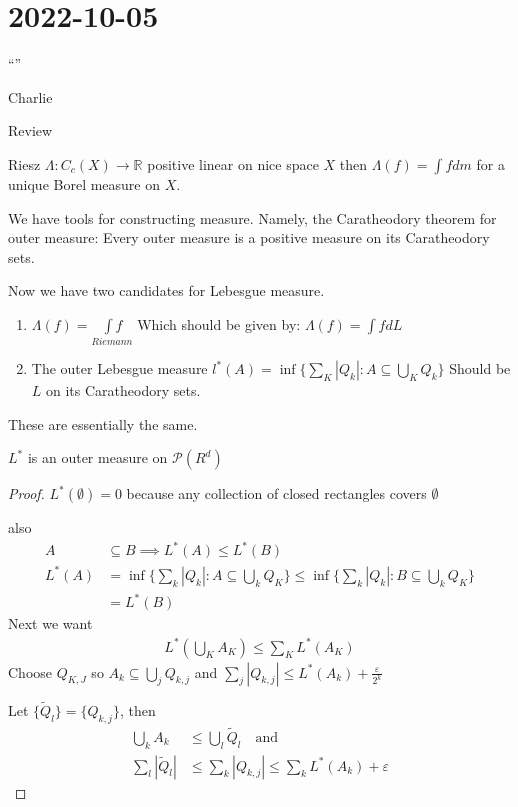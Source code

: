 \section{ 2022-10-05 }

\epigraph{``''}{Charlie}

Review

\begin{theorem}
	Riesz $ \Lambda : C_c (X) \to \mathbb{R}$ positive linear on nice space $X$ then $\Lambda(f) = \int f dm$ for a unique Borel measure on $X$.
\end{theorem}

We have tools for constructing measure. Namely, the Caratheodory theorem for outer measure: Every outer measure is a positive measure on its Caratheodory sets.

Now we have two candidates for Lebesgue measure.

\begin{enumerate}
	\item $\Lambda (f) = \underset{Riemann}{\int f}$
		Which should be given by: $\Lambda(f) = \int f dL$
	\item The outer Lebesgue measure  $l^* (A) = \inf\{\sum_K |Q_k| : A \subseteq \bigcup_{K} Q_k \}$ Should be $L$ on its Caratheodory sets.
\end{enumerate}

These are essentially the same.

\begin{lemma}
	$L^*$ is an outer measure on $\mathcal{P}(R^d)$
\end{lemma}

\begin{proof}
	$L^* (\emptyset)= 0$ because any collection of closed rectangles covers  $\emptyset$

	also
	 \begin{align*}
		 A &\subseteq B \implies L^*(A) \leq L^*(B) \\
	L^*(A) &= \inf\{\sum_{k} |Q_k| : A \subseteq \bigcup_{k} Q_K \} \leq \inf\{\sum_{k} |Q_k| : B \subseteq \bigcup_{k} Q_K \} \\
		   &= L^*(B)
	\end{align*} 
	Next we want
	\begin{align*}
	L^*(\bigcup_{K} A_K) \leq \sum_{K} L^* (A_K)
	\end{align*} 
Choose $Q_{K,J}$ so $A_k \subseteq \bigcup_{j} Q_{k,j}$ and $\sum_{j} | Q_{k,j} | \leq L^* (A_{k}) + \frac{\varepsilon}{2^{k}}$

Let $\{\tilde{Q}_{l}\} = \{Q_{k,j}\}$, then
		\begin{align*}
			\bigcup_{k}A_{k} &\leq \bigcup_{l} \tilde{Q}_{l} \quad \text{and} \\
			\sum_{l} | \tilde{Q}_{l} | &\leq \sum_{k} |Q_{k,j} | \leq \sum_{k} L^* (A_k) + \varepsilon
		\end{align*}
\end{proof}

